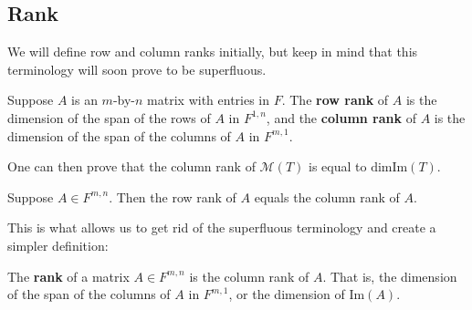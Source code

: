 \documentclass{memoir}
\begin{document}
\subsection{Rank}
We will define row and column ranks initially, but keep in mind that this terminology will soon prove to be superfluous.
\begin{defn}
	Suppose \(A\) is an \(m\)-by-\(n\) matrix with entries in \(F\). The \textbf{row rank} of \(A\) is the dimension of the span of the rows of \(A\) in \(F^{1,n}\), and the \textbf{column rank} of \(A\) is the dimension of the span of the columns of \(A\) in \(F^{m,1}\).
\end{defn}
One can then prove that the column rank of \(\mathcal{M}(T)\) is equal to \(\textrm{dim}\textrm{Im}(T)\).

\begin{lemma}
Suppose $A \in F^{m,n}$. Then the row rank of $A$ equals the column rank of $A$.
\end{lemma}
This is what allows us to get rid of the superfluous terminology and create a simpler definition:
\begin{defn}[rank]
	The \textbf{rank} of a matrix \(A \in F^{m,n}\) is the column rank of \(A\). That is, the dimension of the span of the columns of \(A\) in \(F^{m,1}\), or the dimension of \(\textrm{Im}(A)\).
\end{defn}
\end{document}
